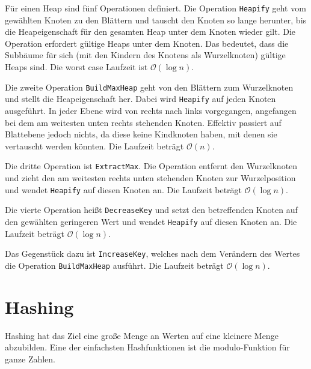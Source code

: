 \documentclass[10pt,a4paper,oneside,ngerman,numbers=noenddot]{scrartcl}
\begin{document}
		Für einen Heap sind fünf Operationen definiert. Die Operation \texttt{Heapify} geht vom gewählten Knoten zu den Blättern und tauscht den Knoten so lange herunter, bis die Heapeigenschaft für den gesamten Heap unter dem Knoten wieder gilt. Die Operation erfordert gültige Heaps unter dem Knoten. Das bedeutet, dass die Subbäume für sich (mit den Kindern des Knotens als Wurzelknoten) gültige Heaps sind. Die worst case Laufzeit ist $\mathcal{O}(\log n)$.
		
		Die zweite Operation \texttt{BuildMaxHeap} geht von den Blättern zum Wurzelknoten und stellt die Heapeigenschaft her. Dabei wird \texttt{Heapify} auf jeden Knoten ausgeführt. In jeder Ebene wird von rechts nach links vorgegangen, angefangen bei dem am weitesten unten rechts stehenden Knoten. Effektiv passiert auf Blattebene jedoch nichts, da diese keine Kindknoten haben, mit denen sie vertauscht werden könnten. Die Laufzeit beträgt $\mathcal{O}(n)$.
		
		Die dritte Operation ist \texttt{ExtractMax}. Die Operation entfernt den Wurzelknoten und zieht den am weitesten rechts unten stehenden Knoten zur Wurzelposition und wendet \texttt{Heapify} auf diesen Knoten an. Die Laufzeit beträgt $\mathcal{O}(\log n)$.
	
		Die vierte Operation heißt \texttt{DecreaseKey} und setzt den betreffenden Knoten auf den gewählten geringeren Wert und wendet \texttt{Heapify} auf diesen Knoten an. Die Laufzeit beträgt $\mathcal{O}(\log n)$.
		
		Das Gegenstück dazu ist \texttt{IncreaseKey}, welches nach dem Verändern des Wertes die Operation \texttt{BuildMaxHeap} ausführt. Die Laufzeit beträgt $\mathcal{O}(\log n)$.
		
\section{Hashing}

	Hashing hat das Ziel eine große Menge an Werten auf eine kleinere Menge abzubilden. Eine der einfachsten Hashfunktionen ist die modulo-Funktion für ganze Zahlen.
	
\end{document}
